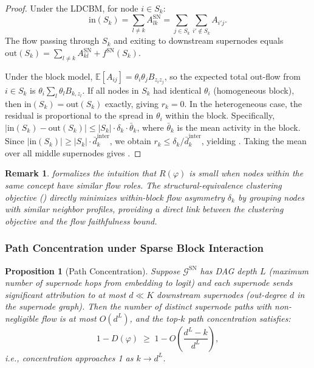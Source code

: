 \documentclass[11pt]{article}
\newtheorem{proposition}[theorem]{Proposition}
\newtheorem{remark}[theorem]{Remark}
\newcommand{\cG}{\mathcal{G}}
\newcommand{\E}{\mathbb{E}}
\newcommand{\1}{\mathbbm{1}}
\begin{document}
\begin{proof}
  Under the LDCBM, for node $i \in S_k$:
  \[
    \mathrm{in}(S_k) = \sum_{l \ne k} A^{\mathrm{SN}}_{lk} = \sum_{j \in S_k} \sum_{i' \notin S_k} A_{i'j}.
  \]
  The flow passing through $S_k$ and exiting to downstream supernodes equals $\mathrm{out}(S_k) = \sum_{l \ne k} A^{\mathrm{SN}}_{kl} + f^{\mathrm{SN}}(S_k)$.

  Under the block model, $\E[A_{ij}] = \theta_i \theta_j B_{z_i z_j}$, so the expected total out-flow from $i \in S_k$ is $\theta_i \sum_{l} \theta_l B_{k, z_l}$.
  If all nodes in $S_k$ had identical $\theta_i$ (homogeneous block), then $\mathrm{in}(S_k) = \mathrm{out}(S_k)$ exactly, giving $r_k = 0$.
  In the heterogeneous case, the residual is proportional to the spread in $\theta_i$ within the block.
  Specifically, $|\mathrm{in}(S_k) - \mathrm{out}(S_k)| \le |S_k| \cdot \delta_k \cdot \bar{\theta}_k$, where $\bar{\theta}_k$ is the mean activity in the block.
  Since $|\mathrm{in}(S_k)| \ge |S_k| \cdot \bar{d}^{\mathrm{inter}}_k$, we obtain $r_k \le \delta_k / \bar{d}^{\mathrm{inter}}_k$, yielding .
  Taking the mean over all middle supernodes gives .
\end{proof}

\begin{remark}
   formalizes the intuition that $R(\varphi)$ is small when nodes within the same concept have similar flow roles.
  The structural-equivalence clustering objective () directly minimizes within-block flow asymmetry $\delta_k$ by grouping nodes with similar neighbor profiles, providing a direct link between the clustering objective and the flow faithfulness bound.
\end{remark}

\subsubsection{Path Concentration under Sparse Block Interaction}

\begin{proposition}[Path Concentration]
\label{prop:path-concentration}
  Suppose $\cG^{\mathrm{SN}}$ has DAG depth $L$ (maximum number of supernode hops from embedding to logit) and each supernode sends significant attribution to at most $d \ll K$ downstream supernodes (out-degree $d$ in the supernode graph).
  Then the number of distinct supernode paths with non-negligible flow is at most $O(d^L)$, and the top-$k$ path concentration satisfies:
  \begin{equation}
    1 - D(\varphi) \;\ge\; 1 - O\!\left(\frac{d^L - k}{d^L}\right),
    \label{eq:path-conc}
  \end{equation}
  i.e., concentration approaches 1 as $k \to d^L$.
\end{proposition}
\end{document}
